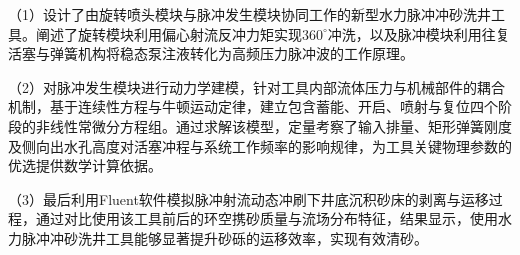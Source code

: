 （1）设计了由旋转喷头模块与脉冲发生模块协同工作的新型水力脉冲冲砂洗井工具。阐述了旋转模块利用偏心射流反冲力矩实现$360^\circ$冲洗，以及脉冲模块利用往复活塞与弹簧机构将稳态泵注液转化为高频压力脉冲波的工作原理。

（2）对脉冲发生模块进行动力学建模，针对工具内部流体压力与机械部件的耦合机制，基于连续性方程与牛顿运动定律，建立包含蓄能、开启、喷射与复位四个阶段的非线性常微分方程组。通过求解该模型，定量考察了输入排量、矩形弹簧刚度及侧向出水孔高度对活塞冲程与系统工作频率的影响规律，为工具关键物理参数的优选提供数学计算依据。

（3）最后利用Fluent软件模拟脉冲射流动态冲刷下井底沉积砂床的剥离与运移过程，通过对比使用该工具前后的环空携砂质量与流场分布特征，结果显示，使用水力脉冲冲砂洗井工具能够显著提升砂砾的运移效率，实现有效清砂。